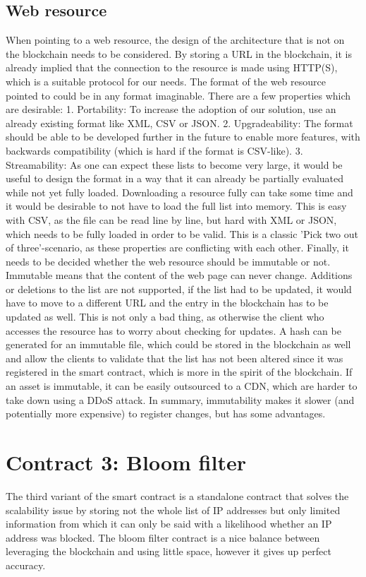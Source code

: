\subsection{Web resource}
When pointing to a web resource, the design of the architecture that is not on the blockchain needs to be considered. By storing a URL in the blockchain, it is already implied that the connection to the resource is made using HTTP(S), which is a suitable protocol for our needs. The format of the web resource pointed to could be in any format imaginable. There are a few properties which are desirable: 1. Portability: To increase the adoption of our solution, use an already existing format like XML, CSV or JSON. 2. Upgradeability: The format should be able to be developed further in the future to enable more features, with backwards compatibility (which is hard if the format is CSV-like). 3. Streamability: As one can expect these lists to become very large, it would be useful to design the format in a way that it can already be partially evaluated while not yet fully loaded. Downloading a resource fully can take some time and it would be desirable to not have to load the full list into memory. This is easy with CSV, as the file can be read line by line, but hard with XML or JSON, which needs to be fully loaded in order to be valid.
This is a classic 'Pick two out of three'-scenario, as these properties are conflicting with each other.
Finally, it needs to be decided whether the web resource should be immutable or not. Immutable means that the content of the web page can never change. Additions or deletions to the list are not supported, if the list had to be updated, it would have to move to a different URL and the entry in the blockchain has to be updated as well. This is not only a bad thing, as otherwise the client who accesses the resource has to worry about checking for updates. A hash can be generated for an immutable file, which could be stored in the blockchain as well and allow the clients to validate that the list has not been altered since it was registered in the smart contract, which is more in the spirit of the blockchain. If an asset is immutable, it can be easily outsourced to a CDN, which are harder to take down using a DDoS attack.
In summary, immutability makes it slower (and potentially more expensive) to register changes, but has some advantages.

\section{Contract 3: Bloom filter}
The third variant of the smart contract is a standalone contract that solves the scalability issue by storing not the whole list of IP addresses but only limited information from which it can only be said with a likelihood whether an IP address was blocked. The bloom filter contract is a nice balance between leveraging the blockchain and using little space, however it gives up perfect accuracy.

